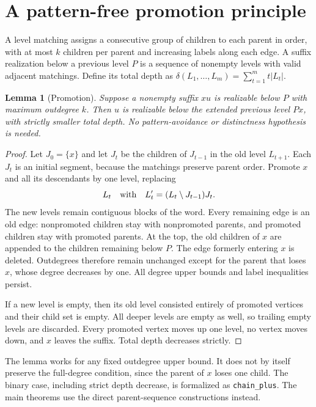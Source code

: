 \documentclass[11pt]{article}
\newtheorem{lemma}[theorem]{Lemma}
\theoremstyle{definition}
\begin{document}
\appendix
\section{A pattern-free promotion principle}\label{sec:cascade}

A level matching assigns a consecutive group of children to each parent in order, with at most $k$ children per parent and increasing labels along each edge. A suffix realization below a previous level $P$ is a sequence of nonempty levels with valid adjacent matchings. Define its total depth as $\delta(L_1,\ldots,L_m)=\sum_{t=1}^m t|L_t|$.

\begin{lemma}[Promotion]\label{lem:promotion}
Suppose a nonempty suffix $x u$ is realizable below $P$ with maximum outdegree $k$. Then $u$ is realizable below the extended previous level $Px$, with strictly smaller total depth. No pattern-avoidance or distinctness hypothesis is needed.
\end{lemma}
\begin{proof}
Let $J_0=\{x\}$ and let $J_t$ be the children of $J_{t-1}$ in the old level $L_{t+1}$. Each $J_t$ is an initial segment, because the matchings preserve parent order. Promote $x$ and all its descendants by one level, replacing
\[
L_t\quad\hbox{with}\quad L'_t=(L_t\setminus J_{t-1})J_t.
\]
The new levels remain contiguous blocks of the word. Every remaining edge is an old edge: nonpromoted children stay with nonpromoted parents, and promoted children stay with promoted parents. At the top, the old children of $x$ are appended to the children remaining below $P$. The edge formerly entering $x$ is deleted. Outdegrees therefore remain unchanged except for the parent that loses $x$, whose degree decreases by one. All degree upper bounds and label inequalities persist.

If a new level is empty, then its old level consisted entirely of promoted vertices and their child set is empty. All deeper levels are empty as well, so trailing empty levels are discarded. Every promoted vertex moves up one level, no vertex moves down, and $x$ leaves the suffix. Total depth decreases strictly.
\end{proof}

The lemma works for any fixed outdegree upper bound. It does not by itself preserve the full-degree condition, since the parent of $x$ loses one child. The binary case, including strict depth decrease, is formalized as \texttt{chain\_plus}. The main theorems use the direct parent-sequence constructions instead.
\end{document}

